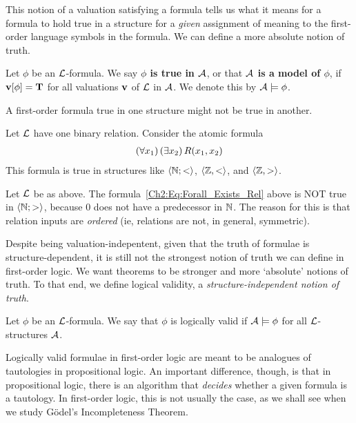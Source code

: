This notion of a valuation satisfying a formula tells us what it means for a formula to hold true in a structure for a \textit{given} assignment of meaning to the first-order language symbols in the formula. We can define a more absolute notion of truth.

\begin{boxdefinition}
    Let $\phi$ be an $\mathcal{L}$-formula. We say \textbf{$\phi$ is true in $\mathcal{A}$}, or that \textbf{$\mathcal{A}$ is a model of $\phi$}, if $\mathbf{v}\!\left[ \phi \right] = \mathbf{T}$ for all valuations $\mathbf{v}$ of $\mathcal{L}$ in $\mathcal{A}$. We denote this by $\mathcal{A} \models \phi$.
\end{boxdefinition}

A first-order formula true in one structure might not be true in another.

\begin{boxexample}
    Let $\mathcal{L}$ have one binary relation. Consider the atomic formula
    \begin{align}
        \left( \forall x_1 \right)\left( \exists x_2 \right) R\!\left( x_1, x_2 \right)
        \label{Ch2:Eq:Forall_Exists_Rel}
    \end{align}
    This formula is true in structures like $\left\langle \mathbb{N}; < \right\rangle$, $\left\langle \mathbb{Z}, < \right\rangle$, and $\left\langle \mathbb{Z}, > \right\rangle$.
\end{boxexample}
\begin{boxnexample}
    Let $\mathcal{L}$ be as above. The formula~\eqref{Ch2:Eq:Forall_Exists_Rel} above is NOT true in $\left\langle \mathbb{N}; > \right\rangle$, because $0$ does not have a predecessor in $\mathbb{N}$. The reason for this is that relation inputs are \textit{ordered} (ie, relations are not, in general, symmetric).
\end{boxnexample}

Despite being valuation-indepentent, given that the truth of formulae is structure-dependent, it is still not the strongest notion of truth we can define in first-order logic. We want theorems to be stronger and more `absolute' notions of truth. To that end, we define logical validity, a \textit{structure-independent notion of truth}.

\begin{boxdefinition}
    Let $\phi$ be an $\mathcal{L}$-formula. We say that $\phi$ is logically valid if $\mathcal{A} \models \phi$ for all $\mathcal{L}$-structures $\mathcal{A}$.
\end{boxdefinition}

Logically valid formulae in first-order logic are meant to be analogues of tautologies in propositional logic. An important difference, though, is that in propositional logic, there is an algorithm that \textit{decides} whether a given formula is a tautology. In first-order logic, this is not usually the case, as we shall see when we study Gödel's Incompleteness Theorem.

